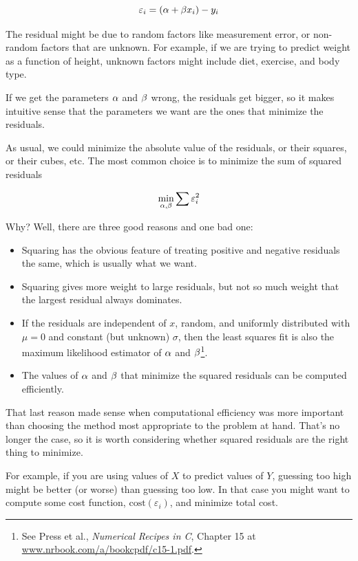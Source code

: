 \documentclass[12pt]{book}
\begin{document}
\newcommand{\eps}{\varepsilon}

\[ \eps_i = (\inter + \slope x_i) - y_i \]

The residual might be due to random factors like measurement error,
or non-random factors that are unknown.  For example, if we are
trying to predict weight as a function of height, unknown factors
might include diet, exercise, and body type.

If we get the parameters $\alpha$ and $\beta$ wrong, the residuals
get bigger, so it makes intuitive sense that the parameters we want
are the ones that minimize the residuals.

As usual, we could minimize the absolute value of the
residuals, or their squares, or their cubes, etc.  The most common
choice is to minimize the sum of squared residuals

\[ \min_{\inter, \slope} \sum \eps_i^2 \]

Why?  Well, there are three good reasons and one bad one:

\begin{itemize}

\item Squaring has the obvious feature of treating positive and
negative residuals the same, which is usually what we want.

\item Squaring gives more weight to large residuals, but not
so much weight that the largest residual always dominates.

\item If the residuals are independent of $x$, random, and uniformly
  distributed with $\mu=0$ and constant (but unknown) $\sigma$, then
  the least squares fit is also the maximum likelihood estimator of
  $\alpha$ and $\beta$\footnote{See Press et al., {\em Numerical Recipes in C},
    Chapter 15 at \url{www.nrbook.com/a/bookcpdf/c15-1.pdf}.}.

\item The values of $\alpha$ and $\beta$ that minimize the squared
  residuals can be computed efficiently.

\end{itemize}

That last reason made sense when computational efficiency was more
important than choosing the method most appropriate to the problem
at hand.  That's no longer the case, so it is worth considering
whether squared residuals are the right thing to minimize.

For example, if you are using values of $X$ to predict values of $Y$,
guessing too high might be better (or worse) than guessing too low.
In that case you might want to compute some cost function,
$\mathrm{cost}(\eps_i)$, and minimize total cost.
\end{document}
